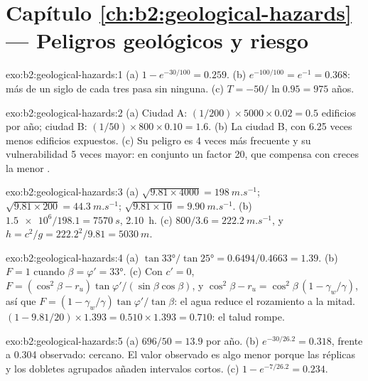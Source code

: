 \section*{Capítulo \ref{ch:b2:geological-hazards} --- Peligros geológicos y riesgo}

\begin{solution}{exo:b2:geological-hazards:1}
(a) $1 - e^{-30/100} = 0.259$. (b) $e^{-100/100} = e^{-1} = 0.368$: más de un siglo de cada tres
pasa sin ninguna. (c) $T = -50/\ln 0.95 = 975$ años.
\end{solution}

\begin{solution}{exo:b2:geological-hazards:2}
(a) Ciudad A: $(1/200) \times 5000 \times 0.02 = 0.5$ edificios por año; ciudad B: $(1/50) \times 800
\times 0.10 = 1.6$. (b) La ciudad B, con 6.25 veces menos edificios expuestos. (c) Su peligro es 4 veces
más frecuente y su vulnerabilidad 5 veces mayor: en conjunto un factor 20, que compensa con creces la
menor .
\end{solution}

\begin{solution}{exo:b2:geological-hazards:3}
(a) $\sqrt{9.81 \times 4000} = \qty{198}{m.s^{-1}}$; $\sqrt{9.81 \times 200} = \qty{44.3}{m.s^{-1}}$;
$\sqrt{9.81 \times 10} = \qty{9.90}{m.s^{-1}}$. (b) $\num{1.5e6}/198.1 = \qty{7570}{s}$, \qty{2.10}{h}.
(c) $800/3.6 = \qty{222.2}{m.s^{-1}}$, y $h = c^2/g = 222.2^2/9.81 = \qty{5030}{m}$.
\end{solution}

\begin{solution}{exo:b2:geological-hazards:4}
(a) $\tan\ang{33}/\tan\ang{25} = 0.6494/0.4663 = 1.39$. (b) $F = 1$ cuando $\beta = \varphi' =
\ang{33}$. (c) Con $c' = 0$, $F = (\cos^2\beta - r_u)\tan\varphi'/(\sin\beta\cos\beta)$, y $\cos^2\beta
- r_u = \cos^2\beta\,(1 - \gamma_w/\gamma)$, así que $F = (1 - \gamma_w/\gamma)\tan\varphi'/\tan\beta$:
el agua reduce el rozamiento a la mitad. $(1 - 9.81/20) \times 1.393 = 0.510 \times 1.393 = 0.710$: el
talud rompe.
\end{solution}

\begin{solution}{exo:b2:geological-hazards:5}
(a) $696/50 = 13.9$ por año. (b) $e^{-30/26.2} = 0.318$, frente a 0.304 observado: cercano. El
valor observado es algo menor porque las réplicas y los dobletes agrupados añaden intervalos
cortos. (c) $1 - e^{-7/26.2} = 0.234$.
\end{solution}

